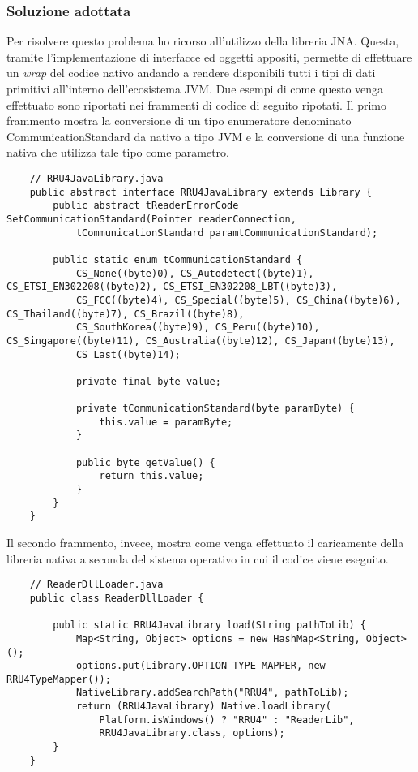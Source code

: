 \subsubsection*{Soluzione adottata}
Per risolvere questo problema ho ricorso all'utilizzo della libreria JNA. Questa, tramite l'implementazione di interfacce ed oggetti appositi, 
permette di effettuare un \emph{wrap} del codice nativo andando a rendere disponibili tutti i tipi di dati primitivi all'interno 
dell'ecosistema JVM. Due esempi di come questo venga effettuato sono riportati nei frammenti di codice di seguito ripotati.
Il primo frammento mostra la conversione di un tipo enumeratore denominato CommunicationStandard da nativo a tipo JVM e la conversione
di una funzione nativa che utilizza tale tipo come parametro.
\begin{lstlisting}
    // RRU4JavaLibrary.java
    public abstract interface RRU4JavaLibrary extends Library {
        public abstract tReaderErrorCode SetCommunicationStandard(Pointer readerConnection, 
            tCommunicationStandard paramtCommunicationStandard);

        public static enum tCommunicationStandard {
            CS_None((byte)0), CS_Autodetect((byte)1), CS_ETSI_EN302208((byte)2), CS_ETSI_EN302208_LBT((byte)3), 
            CS_FCC((byte)4), CS_Special((byte)5), CS_China((byte)6), CS_Thailand((byte)7), CS_Brazil((byte)8), 
            CS_SouthKorea((byte)9), CS_Peru((byte)10), CS_Singapore((byte)11), CS_Australia((byte)12), CS_Japan((byte)13), 
            CS_Last((byte)14);
    
            private final byte value;
    
            private tCommunicationStandard(byte paramByte) {
                this.value = paramByte;
            }
            
            public byte getValue() {
                return this.value;
            }
        }
    }
\end{lstlisting}
Il secondo frammento, invece, mostra come venga effettuato il caricamente della libreria nativa a seconda del sistema operativo
in cui il codice viene eseguito.
\begin{lstlisting}
    // ReaderDllLoader.java
    public class ReaderDllLoader {
        
        public static RRU4JavaLibrary load(String pathToLib) {
		    Map<String, Object> options = new HashMap<String, Object>();
		    options.put(Library.OPTION_TYPE_MAPPER, new RRU4TypeMapper());
            NativeLibrary.addSearchPath("RRU4", pathToLib);
            return (RRU4JavaLibrary) Native.loadLibrary(
		        Platform.isWindows() ? "RRU4" : "ReaderLib",
		        RRU4JavaLibrary.class, options);
        }
    }
\end{lstlisting}

